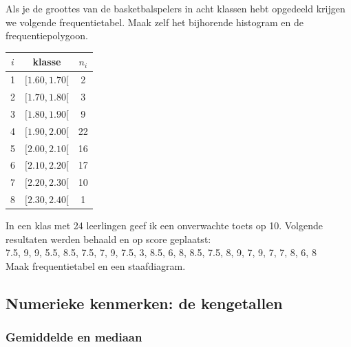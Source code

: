 \documentclass[12pt,twoside]{article}
\begin{document}
\begin{oefening}
Als je de groottes van de basketbalspelers in acht klassen hebt opgedeeld krijgen we volgende frequentietabel. Maak zelf het bijhorende histogram en de frequentiepolygoon.\\
\begin{minipage}{0.5\textwidth}
\begin{center}
\begin{tabular}{c|c|c}
$i$ & klasse     & $n_i$\\
\hline
  1 & $[ 1.60,  1.70[$ &   2\\
  2 & $[ 1.70,  1.80[$ &   3\\
  3 & $[ 1.80,  1.90[$ &   9\\
  4 & $[ 1.90,  2.00[$ &   22\\
  5 & $[ 2.00,  2.10[$ &   16\\
  6 & $[ 2.10,  2.20[$ &   17\\
  7 & $[ 2.20,  2.30[$ &   10\\
  8 & $[ 2.30,  2.40[$ &   1\\
\end{tabular}
\end{center}
\end{minipage}
\begin{minipage}{0.6\textwidth}
\begin{center}
\end{center}
\end{minipage}
\end{oefening}

\begin{oefening}
In een klas met 24 leerlingen geef ik een onverwachte toets op 10. Volgende resultaten werden behaald en op score geplaatst:\\

7.5, 9, 9, 5.5, 8.5, 7.5, 7, 9, 7.5, 3, 8.5, 6, 8, 8.5, 7.5, 8, 9, 7, 9, 7, 7, 8, 6, 8\\

Maak frequentietabel en een staafdiagram.
\end{oefening}



\pagebreak
\subsection{Numerieke kenmerken: de kengetallen}

\subsubsection*{Gemiddelde en mediaan}
\end{document}

